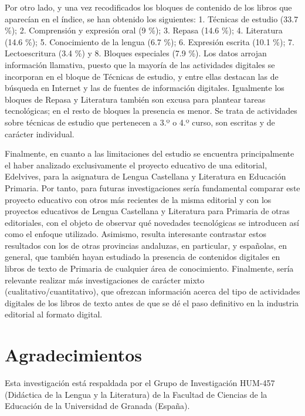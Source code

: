 \documentclass[spanish]{textolivre}
\begin{document}
Por otro lado, y una vez recodificados los bloques de contenido de los libros que aparecían en el índice, se han obtenido los siguientes: 1. Técnicas de estudio (33.7 \%); 2. Comprensión y expresión oral (9 \%); 3. Repasa (14.6 \%); 4. Literatura (14.6 \%); 5. Conocimiento de la lengua (6.7 \%); 6. Expresión escrita (10.1 \%); 7. Lectoescritura (3.4 \%) y 8. Bloques especiales (7.9 \%). Los datos arrojan información llamativa, puesto que la mayoría de las actividades digitales se incorporan en el bloque de Técnicas de estudio, y entre ellas destacan las de búsqueda en Internet y las de fuentes de información digitales. Igualmente los bloques de Repasa y Literatura también son excusa para plantear tareas tecnológicas; en el resto de bloques la presencia es menor. Se trata de actividades sobre técnicas de estudio que pertenecen a 3.º o 4.º curso, son escritas y de carácter individual. 

Finalmente, en cuanto a las limitaciones del estudio se encuentra principalmente el haber analizado exclusivamente el proyecto educativo de una editorial, Edelvives, para la asignatura de Lengua Castellana y Literatura en Educación Primaria. Por tanto, para futuras investigaciones sería fundamental comparar este proyecto educativo con otros más recientes de la misma editorial y con los proyectos educativos de Lengua Castellana y Literatura para Primaria de otras editoriales, con el objeto de observar qué novedades tecnológicas se introducen así como el enfoque utilizado. Asimismo, resulta interesante contrastar estos resultados con los de otras provincias andaluzas, en particular, y españolas, en general, que también hayan estudiado la presencia de contenidos digitales en libros de texto de Primaria de cualquier área de conocimiento. Finalmente, sería relevante realizar más investigaciones de carácter mixto (cualitativo/cuantitativo), que ofrezcan información acerca del tipo de actividades digitales de los libros de texto antes de que se dé el paso definitivo en la industria editorial al formato digital.

\section{Agradecimientos}\label{sec-agradecimento}
Esta investigación está respaldada por el Grupo de Investigación HUM-457 (Didáctica de la Lengua y la Literatura) de la Facultad de Ciencias de la Educación de la Universidad de Granada (España).

\printbibliography\label{sec-bib}
\end{document}
